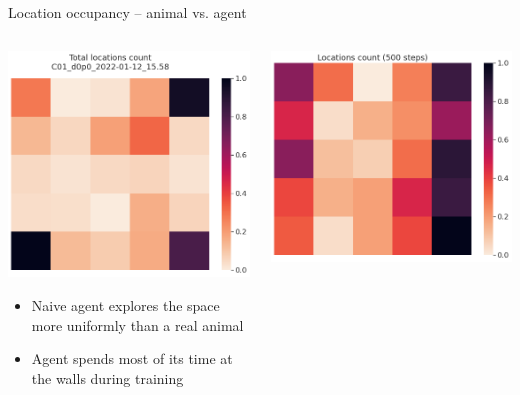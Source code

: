 \documentclass[bigger]{beamer}
\begin{document}
\begin{frame}[label={sec:org6f7572e}]{Location occupancy -- animal vs. agent}
\begin{columns}
\begin{column}{0.5\columnwidth}
\vspace{-0.5em}
\footnotesize
\begin{center}
\includegraphics[height=0.43\textheight]{img/C01_d0p0_2022-01-12_15.58_locations_count.png}
\end{center}
\begin{itemize}
\item Naive agent explores the space more uniformly than a real animal
\item Agent spends most of its time at the walls during training
\end{itemize}
\end{column}
\begin{column}{0.5\columnwidth}
\begin{center}
\includegraphics[height=0.4\textheight]{img/func_approx_ego_locations_count_500steps_all_cues.png}

\end{center}
\end{column}
\end{columns}
\end{frame}
\end{document}
